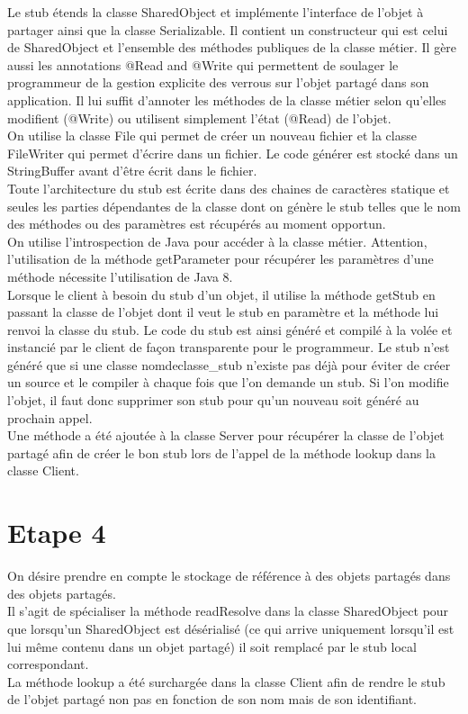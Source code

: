 \documentclass[a4paper,12pt]{article}
\begin{document}
Le stub étends la classe SharedObject et implémente l'interface de l'objet à partager ainsi que la classe Serializable.
Il contient un constructeur qui est celui de SharedObject et l'ensemble des méthodes publiques de la classe métier.
Il gère aussi les annotations @Read and @Write qui permettent de soulager le programmeur de la gestion explicite des verrous sur l'objet partagé dans son application. Il lui suffit d'annoter les méthodes de la classe métier selon qu'elles modifient (@Write) ou utilisent simplement l'état (@Read) de l'objet. \\

On utilise la classe File qui permet de créer un nouveau fichier et la classe FileWriter qui permet d'écrire dans un fichier. Le code générer est stocké dans un StringBuffer avant d'être écrit dans le fichier.\\
Toute l'architecture du stub est écrite dans des chaines de caractères statique et seules les parties dépendantes de la classe dont on génère le stub telles que le nom des méthodes ou des paramètres est récupérés au moment opportun.\\
 On utilise l'introspection de Java pour accéder à la classe métier. Attention, l'utilisation de la méthode getParameter pour récupérer les paramètres d'une méthode nécessite l'utilisation de Java 8.\\

Lorsque le client à besoin du stub d'un objet, il utilise la méthode getStub en passant la classe de l'objet dont il veut le stub en paramètre et la méthode lui renvoi la classe du stub. Le code du stub est ainsi généré et compilé à la volée et instancié par le client de façon transparente pour le programmeur. Le stub n'est généré que si une classe nomdeclasse\_stub n'existe pas déjà pour éviter de créer un source et le compiler à chaque fois que l'on demande un stub. Si l'on modifie l'objet, il faut donc supprimer son stub pour qu'un nouveau soit généré au prochain appel.\\

Une méthode a été ajoutée à la classe Server pour récupérer la classe de l'objet partagé afin de créer le bon stub lors de l'appel de la méthode lookup dans la classe Client.


\clearpage
\section{Etape 4}

\bigskip
\bigskip
\bigskip
\bigskip

On désire prendre en compte le stockage de référence à des objets partagés dans des objets partagés.\\

Il s'agit de spécialiser la méthode readResolve dans la classe SharedObject pour que lorsqu'un SharedObject est désérialisé (ce qui arrive uniquement lorsqu'il est lui même contenu dans un objet partagé) il soit remplacé par le stub local correspondant.\\

La méthode lookup a été surchargée dans la classe Client afin de rendre le stub de l'objet partagé non pas en fonction de son nom mais de son identifiant.
\end{document}
